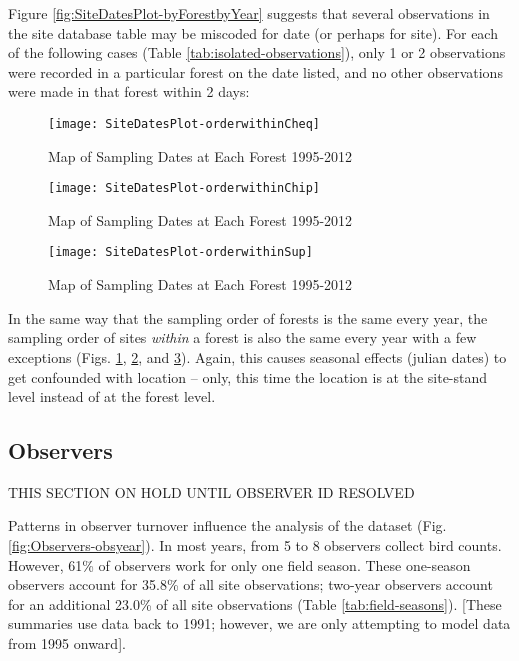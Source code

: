 Figure \ref{fig:SiteDatesPlot-byForestbyYear} suggests that several observations in the site database table may be miscoded for date (or perhaps for site).  For each of the following cases (Table \ref{tab:isolated-observations}), only 1 or 2 observations were recorded in a particular forest on the date listed, and no other observations were made in that forest within 2 days:



\begin{figure}
\texttt{[image: SiteDatesPlot-orderwithinCheq]}
\caption{Map of Sampling Dates at Each Forest 1995-2012}
\label{fig:SiteDatesPlot-orderwithinCheq}
\end{figure}

\begin{figure}
\texttt{[image: SiteDatesPlot-orderwithinChip]}
\caption{Map of Sampling Dates at Each Forest 1995-2012}
\label{fig:SiteDatesPlot-orderwithinChip}
\end{figure}

\begin{figure}
\texttt{[image: SiteDatesPlot-orderwithinSup]}
\caption{Map of Sampling Dates at Each Forest 1995-2012}
\label{fig:SiteDatesPlot-orderwithinSup}
\end{figure}

In the same way that the sampling order of forests is the same every year, the sampling order of sites \textit{within} a forest is also the same every year with a few exceptions (Figs. \ref{fig:SiteDatesPlot-orderwithinCheq}, \ref{fig:SiteDatesPlot-orderwithinChip}, and \ref{fig:SiteDatesPlot-orderwithinSup}).  Again, this causes seasonal effects (julian dates) to get confounded with location -- only, this time the location is at the site-stand level instead of at the forest level.





\subsection{Observers}

THIS SECTION ON HOLD UNTIL OBSERVER ID RESOLVED

Patterns in observer turnover influence the analysis of the dataset (Fig. \ref{fig:Observers-obsyear}).  In most years, from 5 to 8 observers collect bird counts.  However, 61\% of observers work for only one field season.  These one-season observers account for 35.8\% of all site observations; two-year observers account for an additional 23.0\% of all site observations (Table \ref{tab:field-seasons}).  [These summaries use data back to 1991; however, we are only attempting to model data from 1995 onward].

